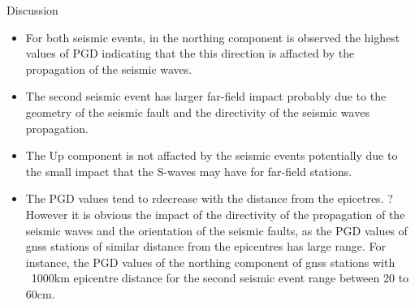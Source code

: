 \documentclass[final,a0,portrait]{beamer}
\newlength{\sepwid}
\newlength{\onecolwid}
\newlength{\twocolwid}
\begin{document}
\begin{frame}[t]
\begin{columns}[t]
\begin{column}{\twocolwid}
\begin{columns}[t]
\begin{column}{\onecolwid}
\begin{block}{Discussion}
{\begin{itemize}\setlength\itemsep{1em}
  \item For both seismic events, in the northing component is observed the highest values of PGD indicating that the this direction is affacted by the propagation of the seismic waves.
  \item The second seismic event has larger far-field impact probably due to the geometry of the seismic fault and the directivity of the seismic waves propagation.
  \item The Up component is not affacted by the seismic events potentially due to the small impact that the S-waves may have for far-field stations.
  \item The PGD values tend to rdecrease with the distance from the epicetres. ?However it is obvious the impact of the directivity of the propagation of the seismic waves and the orientation of the seismic faults, as the PGD values of gnss stations of similar distance from the epicentres has large range. For instance, the PGD values of the northing component of gnss stations with ~1000km epicentre distance for the second seismic event range between 20 to 60cm.
\end{itemize}
}



\end{block}
\end{column}
\end{columns}


\begin{block}{\vspace*{-3ex}}

\nocite{*} %
\tiny{
\vspace{0.15in}}


\end{block}








\end{column} %



\end{columns}
\end{frame}
\end{document}
